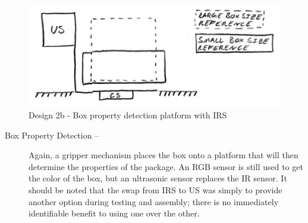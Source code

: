 \documentclass[11pt]{report}
\begin{document}
\begin{figure}[H]
    \centering
    \hspace*{6em}
    \includegraphics[width=0.6\linewidth]{Images//Designs/Design2b.pdf}
    \caption{Design 2b - Box property detection platform with \gls{IRS}}
    \label{fig:design2b}
\end{figure}
\begin{description}
    \item[Box Property Detection --]Again, a gripper mechanism places the box onto a platform that will then determine the properties of the package. An \gls{RGB} sensor is still used to get the color of the box, but an ultrasonic sensor replaces the \gls{IR} sensor. It should be noted that the swap from \gls{IRS} to \gls{US} was simply to provide another option during testing and assembly; there is no immediately identifiable benefit to using one over the other.
\end{description}

\newpage
\end{document}
